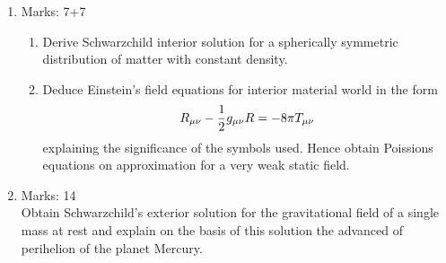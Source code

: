 \documentclass[../main-sheet.tex]{subfiles}
\begin{document}
\begin{enumerate}
\begin{enumerate}
    \end{enumerate}
    \item Marks: 7+7
    \begin{enumerate}
        \item Derive Schwarzchild interior solution for a spherically symmetric distribution of matter with constant density.
        \item Deduce Einstein's field equations for interior material world in the form
        \[ R_{{\mu\nu}}-\frac{1}{2}g_{\mu\nu} R=-8\pi T_{{\mu\nu}}\]
        explaining the significance of the symbols used. Hence obtain Poissions equations on approximation for a very weak static field.
    \end{enumerate}
    \item Marks: 14\\
    Obtain Schwarzchild's exterior solution for the gravitational field of a single mass at rest and explain on the basis of this solution the advanced of perihelion of the planet Mercury.
    

\end{enumerate}
\end{document}
